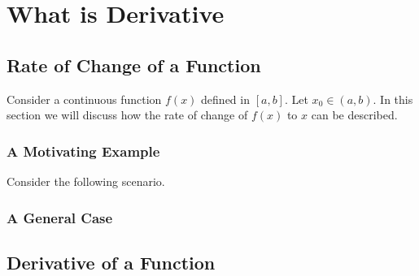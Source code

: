 \chapter{What is Derivative}

\section{Rate of Change of a Function}

Consider a continuous function $f(x)$ defined in $\left[a,b\right]$. Let $x_0\in\left(a,b\right)$. In this section we will discuss how the rate of change of $f(x)$ to $x$ can be described.

\subsection{A Motivating Example}

Consider the following scenario.

\subsection{A General Case}

\section{Derivative of a Function}

















